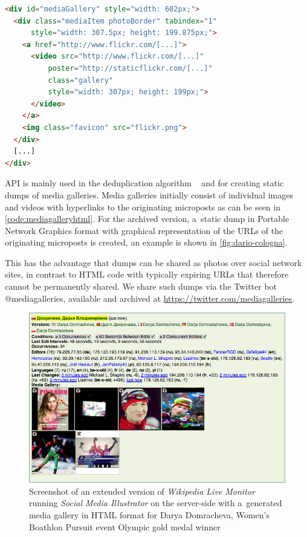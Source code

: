 \documentclass{sig-alternate-somus}
\newcommand{\inlinelistingsize}{\fontsize{8pt}{11pt}}
\let\oldurl\url
\renewcommand{\url}[1]{\inlinelistingsize\oldurl{#1}}
\begin{document}
\vspace{-3em}
\begin{lstlisting}[caption={Simplified \emph{Strict Order, Equal Size}
  HTML code}, label=code:mediagalleryhtml, language=HTML]
<div id="mediaGallery" style="width: 602px;">
  <div class="mediaItem photoBorder" tabindex="1"
      style="width: 307.5px; height: 199.875px;">
    <a href="http://www.flickr.com/[...]">
      <video src="http://www.flickr.com/[...]"
          poster="http://staticflickr.com/[...]"
          class="gallery"
          style="width: 307px; height: 199px;">
      </video>
    </a>
    <img class="favicon" src="flickr.png">
  </div>
  [...]
</div>
\end{lstlisting}

\noindent API is mainly used in the deduplication algorithm%
~\cite{steiner2013clustering}
and for creating static dumps of media galleries.
Media galleries initially consist of individual images and videos
with hyperlinks to the originating microposts
as can be seen in \autoref{code:mediagalleryhtml}.
For the archived version, a~static dump
in Portable Network Graphics format
with graphical representation of the URLs
of the originating microposts is created,
an example is shown in \autoref{fig:dario-cologna}.

This has the advantage that dumps
can be shared as photos over social network sites,
in contrast to  HTML code with typically expiring URLs
that therefore cannot be permanently shared.
We share such dumps via the Twitter bot @mediagalleries,
available and archived at \url{https://twitter.com/mediagalleries}.

\begin{figure}[t!]
  \centering
  \includegraphics[width=0.75\columnwidth]{figures/wikipedia-live-monitor.png}
  \caption{Screenshot of an extended version of \emph{Wikipedia Live Monitor
  }
  running \emph{Social Media Illustrator} on the server-side
  with a~generated media gallery in HTML format
  for Darya Domracheva, Women's Boathlon Pursuit event Olympic gold medal winner}
  \label{fig:wikipedia-live-monitor}    
\end{figure}
\end{document}
